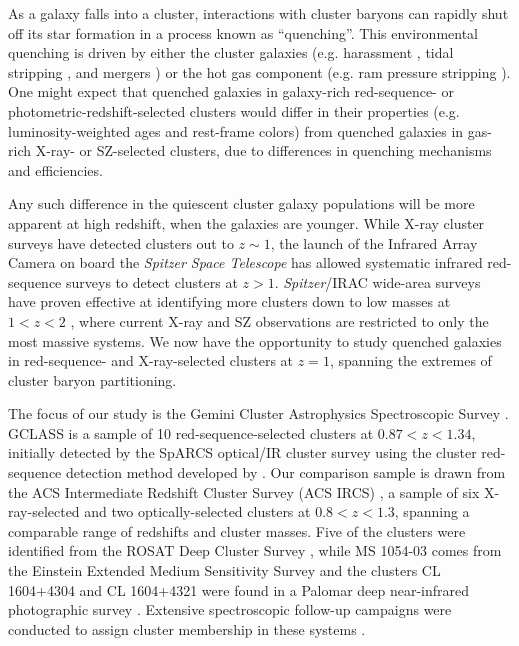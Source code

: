 As a galaxy falls into a cluster, interactions with cluster baryons can rapidly shut off its star formation in a process known as ``quenching''. This environmental quenching is driven by either the cluster galaxies (e.g. harassment \citep{Moore:1996aa}, tidal stripping \citep{Merritt:1983aa}, and mergers \citep{Toomre:1972aa,Rudnick:2012aa}) or the hot gas component (e.g. ram pressure stripping \citep{Gunn:1972aa,Quilis:2000aa}). One might expect that quenched galaxies in galaxy-rich red-sequence- or photometric-redshift-selected clusters would differ in their properties (e.g. luminosity-weighted ages and rest-frame colors) from quenched galaxies in gas-rich X-ray- or SZ-selected clusters, due to differences in quenching mechanisms and efficiencies.%

Any such difference in the quiescent cluster galaxy populations will be more apparent at high redshift, when the galaxies are younger.
While X-ray cluster surveys have detected clusters out to $z \sim 1$, the launch of the Infrared Array Camera \citep[IRAC, ][]{Fazio:2004aa} on board the \textit{Spitzer Space Telescope} \citep{Werner:2004aa} has allowed systematic infrared red-sequence surveys to detect clusters at $z > 1$. {\it Spitzer}/IRAC wide-area surveys have proven effective at identifying more clusters down to low masses at $1  < z < 2$
\citep[e.g.,][]{Papovich:2010yj,Stanford:2012yi,Zeimann:2012bf,muzzin2013,Wylezalek:2013aa,Rettura:2014tt}, where current X-ray and SZ observations are restricted to only the most massive systems. We now have the opportunity to study quenched galaxies in red-sequence- and X-ray-selected clusters at $z = 1$, spanning the extremes of cluster baryon partitioning.

The focus of our study is the Gemini Cluster Astrophysics Spectroscopic Survey \citep[GCLASS \footnote{http://www.faculty.ucr.edu/\~{}gillianw/GCLASS/}, PIs: Wilson \& Yee][]{Muzzin:2012dw}. GCLASS is a sample of 10 red-sequence-selected clusters at $0.87 < z < 1.34$, initially detected by the SpARCS optical/IR cluster survey using the cluster red-sequence detection method developed by \cite{Gladders:2000rq} \citep[see][]{Muzzin:2009jm,Wilson:2009ws,Demarco:2010om}.
Our comparison sample is drawn from the ACS Intermediate Redshift Cluster Survey (ACS IRCS) \citep{fordACS}, a sample of six X-ray-selected and two optically-selected clusters at $0.8 < z < 1.3$, spanning a comparable range of redshifts and cluster masses. Five of the clusters were identified from the ROSAT Deep Cluster Survey \citep{Rosati:1998om}, while MS 1054-03 comes from the Einstein Extended Medium Sensitivity Survey \citep{Gioia:1994rz} and the clusters CL 1604+4304 and CL 1604+4321 were found in a Palomar deep near-infrared photographic survey \citep{Gunn:1986zm}. Extensive spectroscopic follow-up campaigns were conducted to assign cluster membership in these systems \citep[e.g.,][]{Demarco:2005aa,Demarco:2007aa,Holden:2006aa,Gal:2008aa,Rettura:2010aa}.

